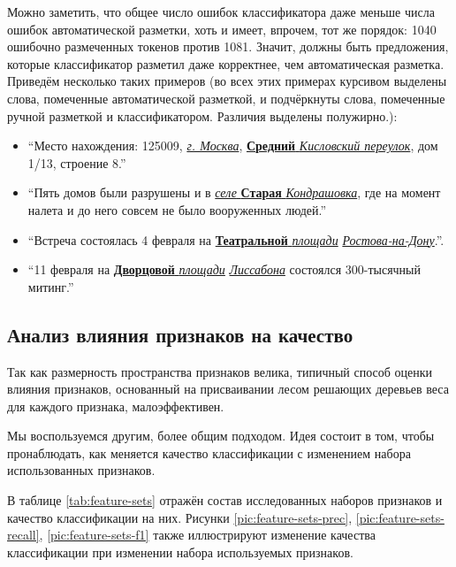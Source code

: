 \documentclass[14pt,russian]{extreport}
\begin{document}
Можно заметить, что общее число ошибок классификатора даже меньше числа ошибок
автоматической разметки, хоть и имеет, впрочем, тот же порядок: 1040 ошибочно
размеченных токенов против 1081. Значит, должны быть предложения, которые
классификатор разметил даже корректнее, чем автоматическая разметка. Приведём
несколько таких примеров (во всех этих примерах курсивом выделены слова,
помеченные автоматической разметкой, и подчёркнуты слова, помеченные ручной
разметкой и классификатором. Различия выделены полужирно.):

\begin{itemize}
  \item ``Место нахождения: 125009, \underline{\it г. Москва}, \underline{\textbf{Средний}
    \it Кисловский переулок}, дом 1/13, строение 8.''
  \item ``Пять домов были разрушены и в \underline{\textit{селе} \textbf{Старая} \textit{Кондрашовка}}, где на момент налета и до него совсем не было вооруженных людей.''
  \item ``Встреча состоялась 4 февраля на \underline{\textbf{Театральной} \textit{площади}} \underline{\textit{Ростова-на-Дону}}.''.
  \item ``11 февраля на \underline{\textbf{Дворцовой} \textit{площади}} \underline{\textit{Лиссабона}} состоялся 300-тысячный митинг.''
\end{itemize}

\subsection{Анализ влияния признаков на качество}

Так как размерность пространства признаков велика, типичный способ оценки
влияния признаков, основанный на присваивании лесом решающих деревьев веса для
каждого признака, малоэффективен.

Мы воспользуемся другим, более общим подходом. Идея состоит в том, чтобы
пронаблюдать, как меняется качество классификации с изменением набора
использованных признаков.

В таблице \ref{tab:feature-sets} отражён состав исследованных наборов
признаков и качество классификации на них. Рисунки
\ref{pic:feature-sets-prec},
\ref{pic:feature-sets-recall}, \ref{pic:feature-sets-f1}
также иллюстрируют изменение качества классификации при изменении набора
используемых признаков.
\end{document}
